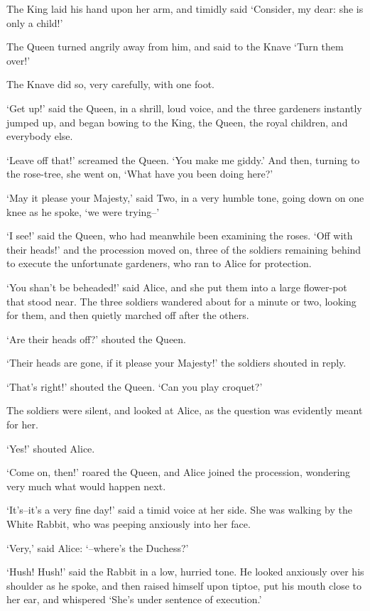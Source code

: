\documentclass[statementpaper,twoside,openany]{memoir}
\begin{document}
The King laid his hand upon her arm, and timidly said `Consider, my dear: she is only a child!'

The Queen turned angrily away from him, and said to the Knave `Turn them over!'

The Knave did so, very carefully, with one foot.

`Get up!' said the Queen, in a shrill, loud voice, and the three gardeners instantly jumped up, and began bowing to the King, the Queen, the royal children, and everybody else.

`Leave off that!' screamed the Queen. `You make me giddy.' And then, turning to the rose-tree, she went on, `What have you been doing here?'

`May it please your Majesty,' said Two, in a very humble tone, going down on one knee as he spoke, `we were trying--'

`I see!' said the Queen, who had meanwhile been examining the roses. `Off with their heads!' and the procession moved on, three of the soldiers remaining behind to execute the unfortunate gardeners, who ran to Alice for protection.

`You shan't be beheaded!' said Alice, and she put them into a large flower-pot that stood near. The three soldiers wandered about for a minute or two, looking for them, and then quietly marched off after the others.

`Are their heads off?' shouted the Queen.

`Their heads are gone, if it please your Majesty!' the soldiers shouted in reply.

`That's right!' shouted the Queen. `Can you play croquet?'

The soldiers were silent, and looked at Alice, as the question was evidently meant for her.

`Yes!' shouted Alice.

`Come on, then!' roared the Queen, and Alice joined the procession, wondering very much what would happen next.

`It's--it's a very fine day!' said a timid voice at her side. She was walking by the White Rabbit, who was peeping anxiously into her face.

`Very,' said Alice: `--where's the Duchess?'

`Hush! Hush!' said the Rabbit in a low, hurried tone. He looked anxiously over his shoulder as he spoke, and then raised himself upon tiptoe, put his mouth close to her ear, and whispered `She's under sentence of execution.'
\end{document}
